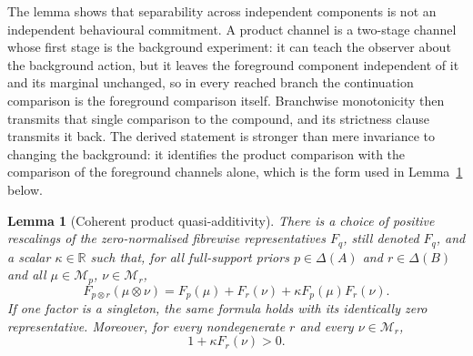 \documentclass[11pt,a4paper]{article}
\newtheorem{lemma}[theorem]{Lemma}
\theoremstyle{definition}
\newcommand{\R}{\mathbb R}
\newcommand{\1}{\mathbf 1}
\begin{document}
The lemma shows that separability across independent components is not an independent behavioural commitment.  A product
channel is a two-stage channel whose first stage is the background experiment: it can teach the observer about the
background action, but it leaves the foreground component independent of it and its marginal unchanged, so in every
reached branch the continuation comparison is the foreground comparison itself.  Branchwise monotonicity then transmits
that single comparison to the compound, and its strictness clause transmits it back.  The derived statement is stronger
than mere invariance to changing the background: it identifies the product comparison with the comparison of the
foreground channels alone, which is the form used in Lemma~\ref{lem:coherentnorm} below.

\begin{lemma}[Coherent product quasi-additivity]\label{lem:coherentnorm}
There is a choice of positive rescalings of the zero-normalised fibrewise representatives $F_q$, still denoted $F_q$,
and a scalar $\kappa\in\R$ such that, for all full-support priors $p\in\Delta(A)$ and $r\in\Delta(B)$ and all
$\mu\in\mathcal M_p$, $\nu\in\mathcal M_r$,
\begin{equation}
F_{p\otimes r}(\mu\otimes\nu)
=F_p(\mu)+F_r(\nu)+\kappa F_p(\mu)F_r(\nu).
\tag{QA}\label{eq:QA}
\end{equation}
If one factor is a singleton, the same formula holds with its identically zero representative.  Moreover, for every
nondegenerate $r$ and every $\nu\in\mathcal M_r$,
\begin{equation}
1+\kappa F_r(\nu)>0.
\tag{POS}\label{eq:QAslope}
\end{equation}
\end{lemma}
\end{document}
